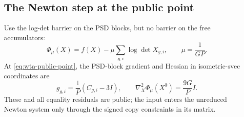 \subsection{The Newton step at the public point}
\label{sec:wta-public-start}

Use the log-det barrier on the PSD blocks, but no barrier on the free
accumulators:
\begin{equation}
 \Phi_\mu(X)=f(X)-\mu\sum_{g,i}\log\det X_{g,i},
 \qquad \mu=\frac1{GP}.
 \label{eq:wta-start-barrier}
\end{equation}
At \eqref{eq:wta-public-point}, the PSD-block gradient and Hessian in
isometric-svec coordinates are
\begin{equation}
 g_{g,i}=\frac1P(C_{g,i}-3I),
 \qquad \nabla_X^2\Phi_\mu(X^0)=\frac{9G}{P}I.
 \label{eq:wta-start-gradient-hessian}
\end{equation}
These and all equality residuals are public; the input enters the unreduced
Newton system only through the signed copy constraints in its matrix.

